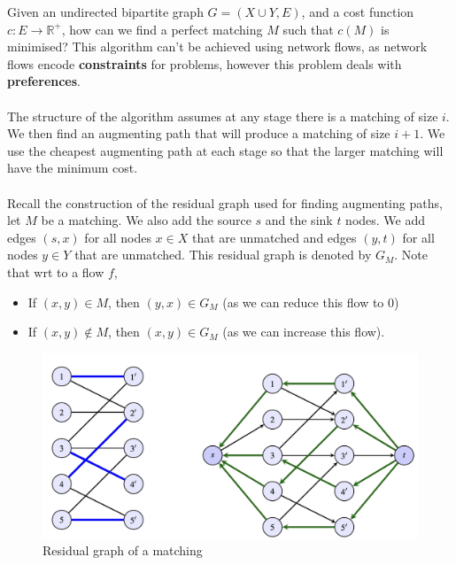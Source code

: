 \documentclass{article}
\theoremstyle{plain}
\theoremstyle{definition}
\begin{document}
    Given an undirected bipartite graph $G = (X \cup Y, E)$, and a cost function $c : E \to \mathbb{R}^+$, how can we find a perfect matching $M$ such that $c(M)$ is minimised? This algorithm can't be achieved using network flows, as network flows encode \textbf{constraints} for problems, however this problem deals with \textbf{preferences}. \\ \\
    The structure of the algorithm assumes at any stage there is a matching of size $i$. We then find an augmenting path that will produce a matching of size $i + 1$. We use the cheapest augmenting path at each stage so that the larger matching will have the minimum cost. \\ \\
    Recall the construction of the residual graph used for finding augmenting paths, let $M$ be a matching. We also add the source $s$ and the sink $t$ nodes. We add edges $(s,x)$ for all nodes $x \in X$ that are unmatched and edges $(y,t)$ for all nodes $y \in Y$ that are unmatched. This residual graph is denoted by $G_M$. Note that wrt to a flow $f$,
    \begin{itemize}
        \item If $(x, y) \in M$, then $(y,x) \in G_M$ (as we can reduce this flow to 0)
        \item If $(x, y) \notin M$, then $(x,y) \in G_M$ (as we can increase this flow). 
    \end{itemize}

    \begin{figure}
        \centering
        \includegraphics[width=\linewidth]{images/mincostresidual.png}
        \caption{Residual graph of a matching}
        \label{fig:mincostresidual}
    \end{figure}
    
\end{document}
